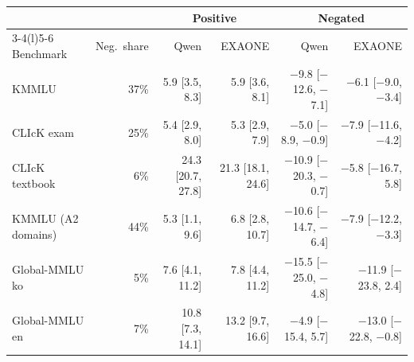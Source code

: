 \begin{tabular}{@{}lrrrrr@{}}
\toprule
 & & \multicolumn{2}{c}{Positive} & \multicolumn{2}{c}{Negated} \\
\cmidrule(lr){3-4}\cmidrule(l){5-6}
Benchmark & Neg.\ share & Qwen & EXAONE & Qwen & EXAONE \\
\midrule
KMMLU & 37\% & 5.9 {\scriptsize[3.5, 8.3]} & 5.9 {\scriptsize[3.6, 8.1]} & $-$9.8 {\scriptsize[$-$12.6, $-$7.1]} & $-$6.1 {\scriptsize[$-$9.0, $-$3.4]} \\
CLIcK exam & 25\% & 5.4 {\scriptsize[2.9, 8.0]} & 5.3 {\scriptsize[2.9, 7.9]} & $-$5.0 {\scriptsize[$-$8.9, $-$0.9]} & $-$7.9 {\scriptsize[$-$11.6, $-$4.2]} \\
CLIcK textbook & 6\% & 24.3 {\scriptsize[20.7, 27.8]} & 21.3 {\scriptsize[18.1, 24.6]} & $-$10.9 {\scriptsize[$-$20.3, $-$0.7]} & $-$5.8 {\scriptsize[$-$16.7, 5.8]} \\
KMMLU (A2 domains) & 44\% & 5.3 {\scriptsize[1.1, 9.6]} & 6.8 {\scriptsize[2.8, 10.7]} & $-$10.6 {\scriptsize[$-$14.7, $-$6.4]} & $-$7.9 {\scriptsize[$-$12.2, $-$3.3]} \\
Global-MMLU ko & 5\% & 7.6 {\scriptsize[4.1, 11.2]} & 7.8 {\scriptsize[4.4, 11.2]} & $-$15.5 {\scriptsize[$-$25.0, $-$4.8]} & $-$11.9 {\scriptsize[$-$23.8, 2.4]} \\
Global-MMLU en & 7\% & 10.8 {\scriptsize[7.3, 14.1]} & 13.2 {\scriptsize[9.7, 16.6]} & $-$4.9 {\scriptsize[$-$15.4, 5.7]} & $-$13.0 {\scriptsize[$-$22.8, $-$0.8]} \\
\bottomrule
\end{tabular}
